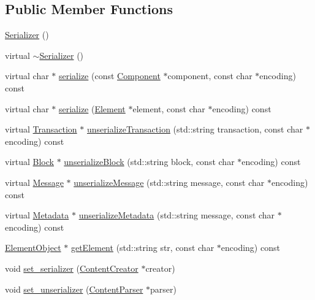 \subsection*{Public Member Functions}
\begin{DoxyCompactItemize}
\item 
\mbox{\hyperlink{classSerializer_a9fe7f31924098f75278d059f8443fd5b}{Serializer}} ()
\item 
virtual \mbox{\hyperlink{classSerializer_a42a7d2d8e622ad1ef5f869813b498aa9}{$\sim$\+Serializer}} ()
\item 
virtual char $\ast$ \mbox{\hyperlink{classSerializer_a5cfe31eb70f4d0c92f2d68c22f39e885}{serialize}} (const \mbox{\hyperlink{classComponent}{Component}} $\ast$component, const char $\ast$encoding) const
\item 
virtual char $\ast$ \mbox{\hyperlink{classSerializer_a38bec517fb3b3cc0778c75b807cb930c}{serialize}} (\mbox{\hyperlink{classElement}{Element}} $\ast$element, const char $\ast$encoding) const
\item 
virtual \mbox{\hyperlink{classTransaction}{Transaction}} $\ast$ \mbox{\hyperlink{classSerializer_ab5fa979a8486be6f49ad10f4810509d7}{unserialize\+Transaction}} (std\+::string transaction, const char $\ast$encoding) const
\item 
virtual \mbox{\hyperlink{classBlock}{Block}} $\ast$ \mbox{\hyperlink{classSerializer_a423fb7c43ca9c23e07000dba0c5a432a}{unserialize\+Block}} (std\+::string block, const char $\ast$encoding) const
\item 
virtual \mbox{\hyperlink{classMessage}{Message}} $\ast$ \mbox{\hyperlink{classSerializer_a1d16df9f35a7580da06a497dfbddffe8}{unserialize\+Message}} (std\+::string message, const char $\ast$encoding) const
\item 
virtual \mbox{\hyperlink{classMetadata}{Metadata}} $\ast$ \mbox{\hyperlink{classSerializer_a64b858f0c2968e888cf796b6f09eed7b}{unserialize\+Metadata}} (std\+::string message, const char $\ast$encoding) const
\item 
\mbox{\hyperlink{classElementObject}{Element\+Object}} $\ast$ \mbox{\hyperlink{classSerializer_ab3bcdbd49167109de13e03878337018a}{get\+Element}} (std\+::string str, const char $\ast$encoding) const
\item 
void \mbox{\hyperlink{classSerializer_aee483f1845ca1b7f7ac4243de9902750}{set\+\_\+serializer}} (\mbox{\hyperlink{classContentCreator}{Content\+Creator}} $\ast$creator)
\item 
void \mbox{\hyperlink{classSerializer_a74ea868b820b4a8472da98c0045418fa}{set\+\_\+unserializer}} (\mbox{\hyperlink{classContentParser}{Content\+Parser}} $\ast$parser)
\end{DoxyCompactItemize}
